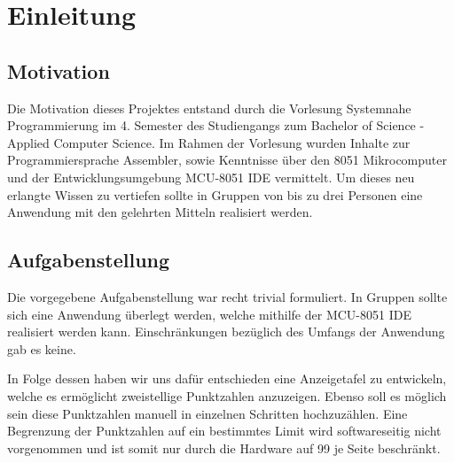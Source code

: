 \chapter{Einleitung}

\section{Motivation}

Die Motivation dieses Projektes entstand durch die Vorlesung Systemnahe Programmierung im 4. Semester des Studiengangs zum Bachelor of Science - Applied Computer Science. Im Rahmen der Vorlesung wurden Inhalte zur
Programmiersprache Assembler, sowie Kenntnisse über den 8051 Mikrocomputer und der Entwicklungsumgebung MCU-8051 IDE vermittelt. Um dieses neu erlangte Wissen zu vertiefen sollte in Gruppen von bis zu drei Personen eine Anwendung mit den gelehrten Mitteln realisiert werden.


\section{Aufgabenstellung}

Die vorgegebene Aufgabenstellung war recht trivial formuliert. In Gruppen sollte sich eine Anwendung überlegt werden, welche mithilfe der MCU-8051 IDE realisiert werden kann. Einschränkungen bezüglich des Umfangs der Anwendung gab es keine.

In Folge dessen haben wir uns dafür entschieden eine Anzeigetafel zu entwickeln, welche es ermöglicht zweistellige Punktzahlen anzuzeigen. Ebenso soll es möglich sein diese Punktzahlen manuell in einzelnen Schritten hochzuzählen. Eine Begrenzung der Punktzahlen auf ein bestimmtes Limit wird softwareseitig nicht
vorgenommen und ist somit nur durch die Hardware auf 99 je Seite beschränkt.
